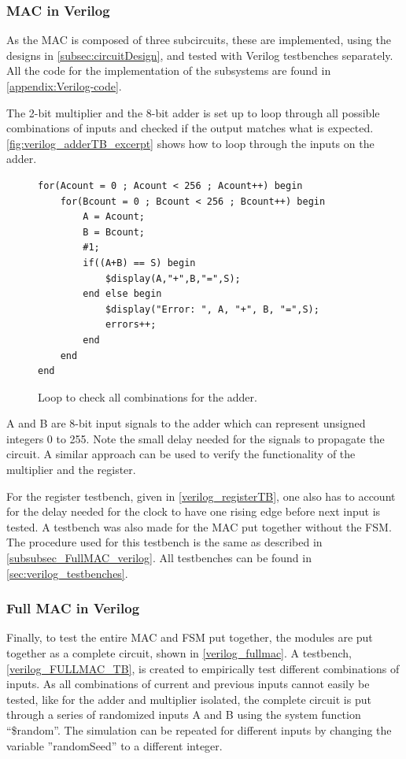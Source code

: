 \subsubsection{MAC in Verilog}
\label{subsubsec:MAC_in_verilog}

As the MAC is composed of three subcircuits, these are implemented, using the designs in \autoref{subsec:circuitDesign}, and tested with Verilog testbenches separately. All the code for the implementation of the subsystems are found in \autoref{appendix:Verilog-code}. 

The 2-bit multiplier and the 8-bit adder is set up to loop through all possible combinations of inputs and checked if the output matches what is expected. \autoref{fig:verilog_adderTB_excerpt} shows how to loop through the inputs on the adder.

\begin{figure}[H]
\centering
\begin{minipage}{0.8\textwidth}
\begin{lstlisting}[style=verilogStyle]
for(Acount = 0 ; Acount < 256 ; Acount++) begin
    for(Bcount = 0 ; Bcount < 256 ; Bcount++) begin
        A = Acount;
        B = Bcount;
        #1;
        if((A+B) == S) begin
            $display(A,"+",B,"=",S);
        end else begin
            $display("Error: ", A, "+", B, "=",S);
            errors++;
        end
    end
end
\end{lstlisting}
\end{minipage}
\caption{Loop to check all combinations for the adder.}
\label{fig:verilog_adderTB_excerpt}
\end{figure}

A and B are 8-bit input signals to the adder which can represent unsigned integers 0 to 255. Note the small delay needed for the signals to propagate the circuit. A similar approach can be used to verify the functionality of the multiplier and the register. 

For the register testbench, given in \autoref{verilog_registerTB}, one also has to account for the delay needed for the clock to have one rising edge before next input is tested. A testbench was also made for the MAC put together without the FSM. The procedure used for this testbench is the same as described in \autoref{subsubsec_FullMAC_verilog}. All testbenches can be found in \autoref{sec:verilog_testbenches}.

\subsubsection{Full MAC in Verilog}
\label{subsubsec_FullMAC_verilog}

Finally, to test the entire MAC and FSM put together, the modules are put together as a complete circuit, shown in \autoref{verilog_fullmac}. A testbench, \autoref{verilog_FULLMAC_TB}, is created to empirically test different combinations of inputs. As all combinations of current and previous inputs cannot easily be tested, like for the adder and multiplier isolated, the complete circuit is put through a series of randomized inputs A and B using the system function ``\$random''. The simulation can be repeated for different inputs by changing the variable ''randomSeed'' to a different integer.
